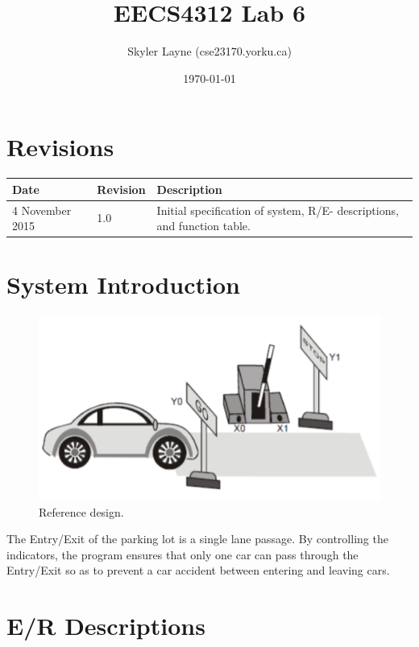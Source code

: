 \documentclass[fontsize=12pt,paper=letter,twoside]{scrartcl}
\title{EECS4312 Lab 6}
\author{Skyler Layne (cse23170\@cse.yorku.ca)}
\date{\today} %
\begin{document}
\maketitle

\section*{Revisions}

\begin{tabular}{|l|l|p{3in}|}
\hline
Date & Revision& Description \\ 
\hline
4 November  2015
& 1.0       
& Initial specification of system, R/E- descriptions, and function table.\\ 
\hline
\end{tabular}
\newpage
\tableofcontents
\newpage


%

\section{System Introduction}
\begin{figure}
\center
\includegraphics[width=.7\textwidth]{system.png}
\caption{Reference design.}
\end{figure}
{The Entry/Exit of the parking lot is a single lane passage. By controlling the indicators, the program ensures that only one car can pass through the Entry/Exit so as to prevent a car accident between entering and leaving cars.}\\

\newpage
\section{E/R Descriptions}
\end{document}
